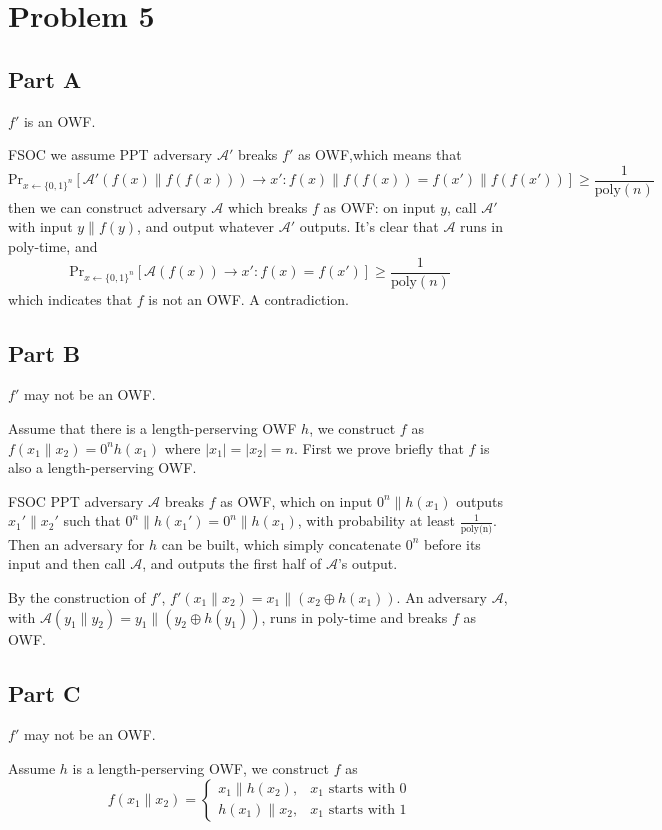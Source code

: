 \documentclass[8pt]{article}
\theoremstyle{compact}
\def\ge{\geqslant}
\begin{document}
\section*{Problem 5}

\subsection*{Part A}
$f'$ is an OWF.

FSOC we assume PPT adversary $\mathcal A'$ breaks $f'$ as OWF,which means that $$\text{Pr}_{x \gets \{0, 1\}^n}\left[\mathcal A'(f(x) \| f(f(x))) \to x': f(x) \| f(f(x)) = f(x') \| f(f(x'))\right] \ge \frac{1}{\text{poly}(n)}$$ then we can construct adversary $\mathcal A$ which breaks $f$ as OWF: on input $y$, call $\mathcal A'$ with input $y \| f(y)$, and output whatever $\mathcal A'$ outputs. It's clear that $\mathcal A$ runs in poly-time, and $$\text{Pr}_{x \gets \{0, 1\}^n}\left[\mathcal A(f(x)) \to x': f(x) = f(x') \right] \ge \frac{1}{\text{poly}(n)}$$
which indicates that $f$ is not an OWF. A contradiction.
\subsection*{Part B}
$f'$ may not be an OWF.

Assume that there is a length-perserving OWF $h$, we construct $f$ as $f(x_1 \| x_2) = 0^{n}h(x_1)$ where $|x_1| = |x_2| = n$. First we prove briefly that $f$ is also a length-perserving OWF.

FSOC PPT adversary $\mathcal A$ breaks $f$ as OWF, which on input $0^n \| h(x_1)$ outputs $x_1' \| x_2'$ such that $0^n \| h(x_1') = 0^n \| h(x_1)$, with probability at least $\frac{1}{\text{poly(n)}}$. Then an adversary for $h$ can be built, which simply concatenate $0^n$ before its input and then call $\mathcal A$, and outputs the first half of $\mathcal A$'s output.

By the construction of $f'$, $f'(x_1 \| x_2) = x_1 \| (x_2 \oplus h(x_1))$. An adversary $\mathcal A$, with $\mathcal A(y_1 \| y_2) = y_1 \| (y_2 \oplus h(y_1))$, runs in poly-time and breaks $f$ as OWF. 
\subsection*{Part C}
$f'$ may not be an OWF.

Assume $h$ is a length-perserving OWF, we construct $f$ as $$f(x_1 \| x_2) = \begin{cases}
	x_1 \| h(x_2), & x_1 \text{ starts with } 0\\
	h(x_1) \| x_2, & x_1 \text{ starts with } 1
\end{cases}$$
\end{document}

